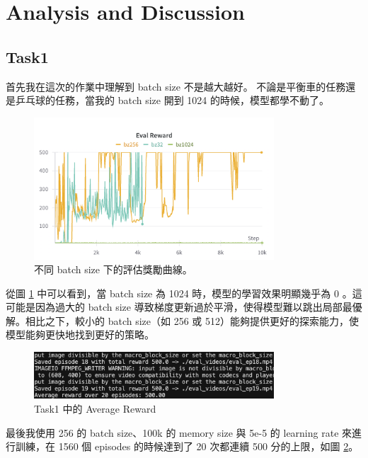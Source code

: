 \clearpage
\section{Analysis and Discussion}


\subsection{Task1}
首先我在這次的作業中理解到 batch size 不是越大越好。
不論是平衡車的任務還是乒乓球的任務，當我的 batch size 開到 1024 的時候，模型都學不動了。

\begin{figure}[htbp]
    \centering
    \includegraphics[width=0.8\textwidth]{figures/Eval_Reward.png}
    \caption{不同 batch size 下的評估獎勵曲線。}
    \label{fig:eval_reward}
\end{figure}

從圖 \ref{fig:eval_reward} 中可以看到，當 batch size 為 1024 時，模型的學習效果明顯幾乎為 0 。這可能是因為過大的 batch size 導致梯度更新過於平滑，使得模型難以跳出局部最優解。相比之下，較小的 batch size（如 256 或 512）能夠提供更好的探索能力，使模型能夠更快地找到更好的策略。


\begin{figure}[htbp]
    \centering
    \includegraphics[width=0.8\textwidth]{figures/task1_reward.png}
    \caption{Task1 中的 Average Reward}
    \label{fig:task1_reward}
\end{figure}


最後我使用 256 的 batch size、100k 的 memory size 與 5e-5 的 learning rate 來進行訓練，在 1560 個 episodes 的時候達到了 20 次都連續 500 分的上限，如圖 \ref{fig:task1_reward}。

